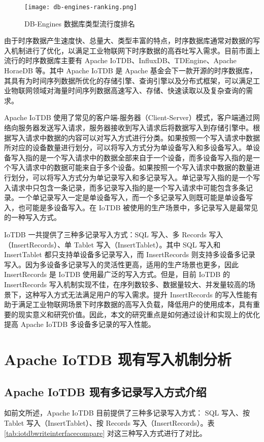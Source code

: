 \begin{figure}
  \centering
  \texttt{[image: db-engines-ranking.png]}
  \caption{DB-Engines 数据库类型流行度排名}
  \label{fig:db-engine}
\end{figure}

由于时序数据产生速度快、总量大、类型丰富的特点，时序数据库通常对数据的写入机制进行了优化，以满足工业物联网下时序数据的高吞吐写入需求。目前市面上流行的时序数据库主要有 Apache IoTDB\cite{wang2023apache}、InfluxDB\cite{naqvi2017time}、TDEngine\cite{tdengine2024github}、Apache HoraeDB\cite{apache2024horaedb} 等。其中 Apache IoTDB 是 Apache 基金会下一款开源的时序数据库，其具有为时间序列数据所优化的存储引擎、查询引擎以及分布式框架，可以满足工业物联网领域对海量时间序列数据高速写入、存储、快速读取以及复杂查询的需求\cite{wang2020apache}。

Apache IoTDB 使用了常见的客户端-服务器（Client-Server）模式，客户端通过网络向服务器发送写入请求，服务器接收到写入请求后将数据写入到存储引擎中。根据写入请求中数据的内容可以对写入方式进行分类。如果按照一个写入请求中数据所对应的设备数量进行划分，可以将写入方式分为单设备写入和多设备写入。单设备写入指的是一个写入请求中的数据全部来自于一个设备，而多设备写入指的是一个写入请求中的数据可能来自于多个设备。如果按照一个写入请求中数据的数量进行划分，可以将写入方式分为单记录写入和多记录写入。单记录写入指的是一个写入请求中只包含一条记录，而多记录写入指的是一个写入请求中可能包含多条记录。一个单记录写入一定是单设备写入，而一个多记录写入则既可能是单设备写入，也可能是多设备写入。在 IoTDB 被使用的生产场景中，多记录写入是最常见的一种写入方式。

IoTDB 一共提供了三种多记录写入方式：SQL 写入、多 Records 写入（InsertRecords）、单 Tablet 写入（InsertTablet）。其中 SQL 写入和 InsertTablet 都只支持单设备多记录写入，而 InsertRecords 则支持多设备多记录写入。因为多设备多记录写入的灵活性更高，适用的生产场景也更多，因此 InsertRecords 是 IoTDB 使用最广泛的写入方式。但是，目前 IoTDB 的 InsertRecords 写入机制实现不佳，在序列数较多、数据量较大、并发量较高的场景下，这种写入方式无法满足用户的写入需求。提升 InsertRecords 的写入性能有助于满足工业物联网场景下时序数据的高写入负载，降低用户的使用成本，具有重要的现实意义和研究价值。因此，本文的研究重点是如何通过设计和实现上的优化提高 Apache IoTDB 多设备多记录的写入性能。
\section{Apache IoTDB 现有写入机制分析\label{sec:chap1-sec2}}
\subsection{Apache IoTDB 现有多记录写入方式介绍}
如前文所述，Apache IoTDB 目前提供了三种多记录写入方式： SQL 写入、按 Tablet 写入（InsertTablet）、按 Records 写入（InsertRecords）。表 \ref{tab:iotdbwriteinterfacecompare} 对这三种写入方式进行了对比。

